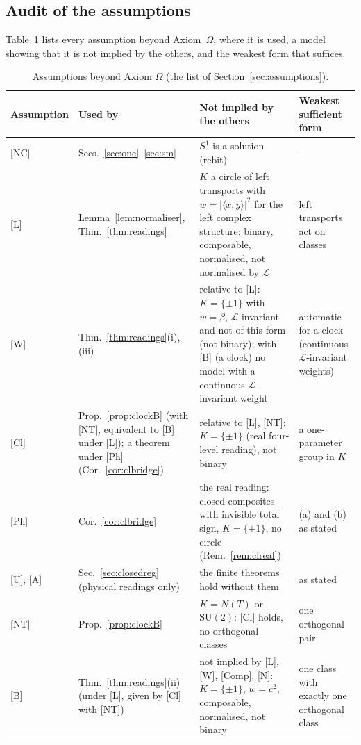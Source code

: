 \documentclass[aps,pra,onecolumn,superscriptaddress,nofootinbib,10pt]{revtex4-2}
\theoremstyle{definition}
\theoremstyle{remark}
\newcommand{\cL}{\mathcal{L}}
\newcommand{\ip}[2]{\langle #1,#2\rangle}
\newcommand{\SU}{\mathrm{SU}}
\begin{document}
\subsection{Audit of the assumptions}
Table~\ref{tab:audit} lists every assumption beyond Axiom~$\Omega$, where it is used, a model showing
that it is not implied by the others, and the weakest form that suffices.

\begin{table}[h]
\caption{Assumptions beyond Axiom $\Omega$ (the list of Section~\ref{sec:assumptions}).}
\label{tab:audit}
\footnotesize
\begin{tabular}{@{}p{}p{}p{}p{}@{}}
\toprule
Assumption & Used by & Not implied by the others & Weakest sufficient form\\
\midrule
{[NC]} & Secs.~\ref{sec:one}--\ref{sec:sm} & $S^1$ is a solution (rebit) & ---\\
{[L]} & Lemma~\ref{lem:normaliser}, Thm.~\ref{thm:readings} & $K$ a circle of left transports with $w=\lvert\ip xy\rvert^2$ for the left complex structure: binary, composable, normalised, not normalised by $\cL$ & left transports act on classes\\
{[W]} & Thm.~\ref{thm:readings}(i), (iii) & relative to [L]: $K=\{\pm1\}$ with $w=\beta$, $\cL$-invariant and not of this form (not binary); with [B] (a clock) no model with a continuous $\cL$-invariant weight & automatic for a clock (continuous $\cL$-invariant weights)\\
{[Cl]} & Prop.~\ref{prop:clockB} (with [NT], equivalent to [B] under [L]); a theorem under [Ph] (Cor.~\ref{cor:clbridge}) & relative to [L], [NT]: $K=\{\pm1\}$ (real four-level reading), not binary & a one-parameter group in $K$\\
{[Ph]} & Cor.~\ref{cor:clbridge} & the real reading: closed composites with invisible total sign, $K=\{\pm1\}$, no circle (Rem.~\ref{rem:clreal}) & (a) and (b) as stated\\
{[U]}, {[A]} & Sec.~\ref{sec:closedreg} (physical readings only) & the finite theorems hold without them & as stated\\
{[NT]} & Prop.~\ref{prop:clockB} & $K=N(T)$ or $\SU(2)$: [Cl] holds, no orthogonal classes & one orthogonal pair\\
{[B]} & Thm.~\ref{thm:readings}(ii) (under [L], given by [Cl] with [NT]) & not implied by [L], [W], [Comp], [N]: $K=\{\pm1\}$, $w=c^2$, composable, normalised, not binary & one class with exactly one orthogonal class\\

\end{tabular}
\end{table}
\end{document}
